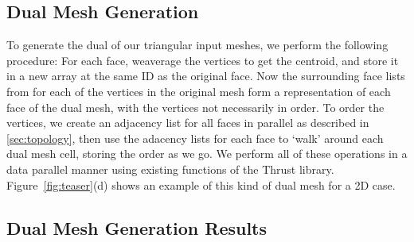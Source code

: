 \documentclass[10pt,journal,cspaper,compsoc]{IEEEtran}
\begin{document}
\subsection{Dual Mesh Generation}
To generate the dual of our triangular input meshes, we perform the following procedure: For each face, weaverage the vertices to get the centroid, and store it in a new array at the same ID as the original face. Now the surrounding face lists from  for each of the vertices in the original mesh form a representation of each face of the dual mesh, with the vertices not necessarily in order. To order the vertices, we create an adjacency list for all faces in parallel as described in \ref{sec:topology}, then use the adacency lists for each face to `walk' around each dual mesh cell, storing the order as we go. We perform all of these operations in a data parallel manner using existing functions of the Thrust library. Figure~\ref{fig:teaser}(d) shows an example of this kind of dual mesh for a 2D case.


\subsection{Dual Mesh Generation Results}
\end{document}

